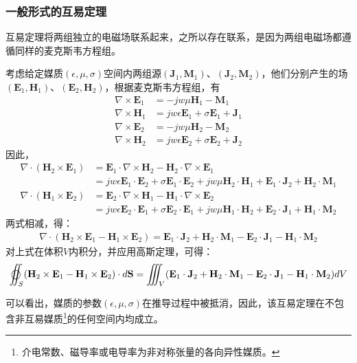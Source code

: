 \documentclass{article}
\numberwithin{equation}{section}
\begin{document}
\subsubsection{一般形式的互易定理}
互易定理将两组独立的电磁场联系起来，之所以存在联系，是因为两组电磁场都遵循同样的麦克斯韦方程组。
\par
考虑给定媒质$(\epsilon,\mu,\sigma)$空间内两组源$(\mathbf{J}_1,\mathbf{M}_1)$、$(\mathbf{J}_2,\mathbf{M}_2)$，他们分别产生的场$(\mathbf{E}_1,\mathbf{H}_1)$、$(\mathbf{E}_2,\mathbf{H}_2)$，根据麦克斯韦方程组，有
\begin{align}
    \label{eq:eq195}
    \nabla\times\mathbf{E}_1&=-jw\mu\mathbf{H}_1-\mathbf{M}_1 \\
    \label{eq:eq196}
    \nabla\times\mathbf{H}_1&=jw\epsilon\mathbf{E}_1+\sigma\mathbf{E}_1+\mathbf{J}_1 \\
    \label{eq:eq197}
    \nabla\times\mathbf{E}_2&=-jw\mu\mathbf{H}_2-\mathbf{M}_2 \\
    \label{eq:eq198}
    \nabla\times\mathbf{H}_2&=jw\epsilon\mathbf{E}_2+\sigma\mathbf{E}_2+\mathbf{J}_2
\end{align}
因此，
\begin{align}
    \label{eq:eq199}
    \nabla\cdot(\mathbf{H}_2\times\mathbf{E}_1)&=\mathbf{E}_1\cdot\nabla\times\mathbf{H}_2-\mathbf{H}_2\cdot\nabla\times\mathbf{E}_1 \nonumber \\
                                               &=jw\epsilon\mathbf{E}_1\cdot\mathbf{E}_2+\sigma\mathbf{E}_1\cdot\mathbf{E}_2+jw\mu\mathbf{H}_2\cdot\mathbf{H}_1+\mathbf{E}_1\cdot\mathbf{J}_2+\mathbf{H}_2\cdot\mathbf{M}_1 \\
    \label{eq:eq200}
    \nabla\cdot(\mathbf{H}_1\times\mathbf{E}_2)&=\mathbf{E}_2\cdot\nabla\times\mathbf{H}_1-\mathbf{H}_1\cdot\nabla\times\mathbf{E}_2 \nonumber \\
                                               &=jw\epsilon\mathbf{E}_2\cdot\mathbf{E}_1+\sigma\mathbf{E}_2\cdot\mathbf{E}_1+jw\mu\mathbf{H}_1\cdot\mathbf{H}_2+\mathbf{E}_2\cdot\mathbf{J}_1+\mathbf{H}_1\cdot\mathbf{M}_2
\end{align}
两式相减，得\textbf{\color{blue}{微分形式的互易定理}}：
\begin{align}
    \label{eq:eq201}
    \nabla\cdot(\mathbf{H}_2\times\mathbf{E}_1-\mathbf{H}_1\times\mathbf{E}_2)=\mathbf{E}_1\cdot\mathbf{J}_2+\mathbf{H}_2\cdot\mathbf{M}_1-\mathbf{E}_2\cdot\mathbf{J}_1-\mathbf{H}_1\cdot\mathbf{M}_2
\end{align}
对上式在体积$V$内积分，并应用高斯定理，可得\textbf{\color{blue}{积分形式的互易定理}}：
\begin{align}
    \label{eq:eq202}
    \varoiint_S(\mathbf{H}_2\times\mathbf{E}_1-\mathbf{H}_1\times\mathbf{E}_2)\cdot d\mathbf{S}=\iiint_V(\mathbf{E}_1\cdot\mathbf{J}_2+\mathbf{H}_2\cdot\mathbf{M}_1-\mathbf{E}_2\cdot\mathbf{J}_1-\mathbf{H}_1\cdot\mathbf{M}_2)dV
\end{align}
\par
可以看出，媒质的参数$(\epsilon,\mu,\sigma)$在推导过程中被抵消，因此，该互易定理在不包含非互易媒质\footnote{介电常数、磁导率或电导率为非对称张量的各向异性媒质。}的任何空间内均成立。
\end{document}
